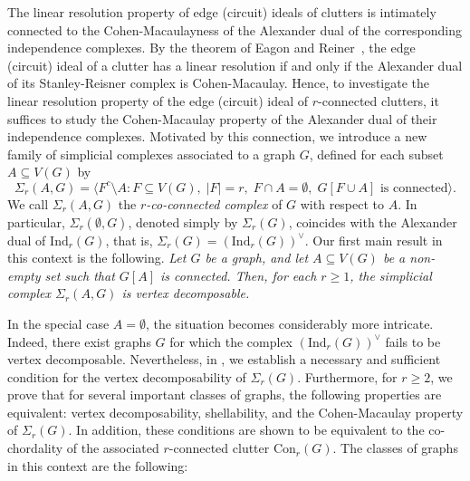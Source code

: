 \documentclass[12pt,reqno]{amsart}
\theoremstyle{definition}
\newenvironment{customthm}[1]
  {\renewcommand\theinnercustomthm{#1}\innercustomthm\itshape}
  {\endinnercustomthm}
\begin{document}
	
The linear resolution property of edge (circuit) ideals of clutters is intimately connected to the Cohen-Macaulayness of the Alexander dual of the corresponding independence complexes. By the theorem of Eagon and Reiner~\cite{EagonReiner1998}, the edge (circuit) ideal of a clutter has a linear resolution if and only if the Alexander dual of its Stanley-Reisner complex is Cohen-Macaulay. Hence, to investigate the linear resolution property of the edge (circuit) ideal of $r$-connected clutters, it suffices to study the Cohen-Macaulay property of the Alexander dual of their independence complexes. Motivated by this connection, we introduce a new family of simplicial complexes associated to a graph $G$, defined for each subset $A \subseteq V(G)$ by
	\[
	\Sigma_r(A,G) = \big\langle F^c \setminus A : F\subseteq V(G),\; |F|=r,\; F\cap A=\emptyset,\; G[F\cup A]\text{ is connected} \big\rangle.
	\]
	We call $\Sigma_r(A,G)$ the \emph{$r$-co-connected complex} of $G$ with respect to $A$. In particular, $\Sigma_r(\emptyset,G)$, denoted simply by $\Sigma_r(G)$, coincides with the Alexander dual of $\mathrm{Ind}_r(G)$, that is, $\Sigma_r(G)=(\mathrm{Ind}_r(G))^{\vee}$. Our first main result in this context is the following.
    \begin{customthm}{\ref{Vertex decoposable}}
Let $G$ be a graph, and let $A \subseteq V(G)$ be a non-empty set such that $G[A]$ is connected. Then, for each $r \geq 1$, the simplicial complex $\Sigma_r(A,G)$ is vertex decomposable.
    \end{customthm}
	
	In the special case $A=\emptyset$, the situation becomes considerably more intricate. Indeed, there exist graphs $G$ for which the complex $(\mathrm{Ind}_r(G))^{\vee}$ fails to be vertex decomposable. Nevertheless, in , we establish a necessary and sufficient condition for the vertex decomposability of $\Sigma_r(G)$. Furthermore, for $ r\ge 2$, we prove that for several important classes of graphs, the following properties are equivalent: vertex decomposability, shellability, and the Cohen-Macaulay property of $\Sigma_r(G)$. In addition, these conditions are shown to be equivalent to the co-chordality of the associated $r$-connected clutter $\mathrm{Con}_r(G)$. The classes of graphs in this context are the following:
\end{document}
